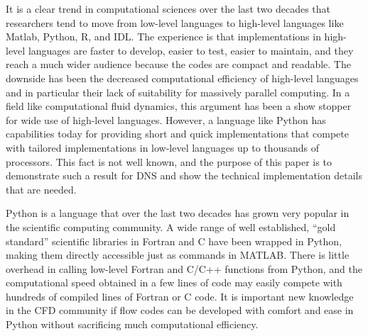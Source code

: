 \documentclass[final,1p,times]{elsarticle}
\begin{document}
It is a clear trend in computational sciences over the last two decades
that researchers tend to move from low-level languages to high-level languages
like Matlab, Python, R, and IDL. The experience is that implementations
in high-level languages are faster to develop, easier to test,
easier to maintain, and they
reach a much wider audience because the codes are compact and readable.
The downside has been the decreased computational
efficiency of high-level languages and in particular their lack of
suitability for massively parallel computing. In a field like computational
fluid dynamics, this argument has been a show stopper for wide use
of high-level languages. However, a language like Python has capabilities
today for providing short and quick implementations that compete with
tailored implementations in low-level languages up to thousands of processors.
This fact is not well known, and the purpose of this paper is to
demonstrate such a result for DNS and show the technical implementation
details that are needed.


Python is a language that over the last two decades has grown very popular in the scientific computing community. A wide range of well established, ``gold standard'' scientific libraries in Fortran and C have been wrapped in Python, making them directly accessible just as commands in MATLAB. There is little overhead in calling low-level Fortran and C/C++ functions from Python, and the computational speed obtained in a few lines of code may easily compete with hundreds of compiled lines of Fortran or C code. It is important new knowledge in the CFD community if flow codes can be developed with comfort and ease in Python without sacrificing much computational efficiency.
\end{document}
